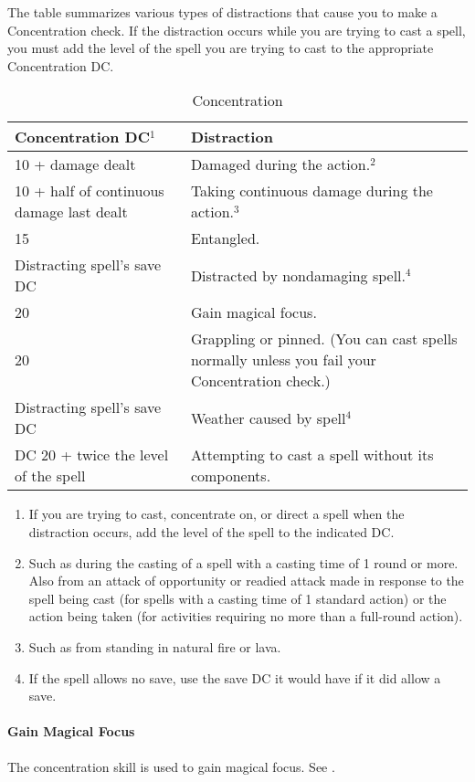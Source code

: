 The  table summarizes various types of distractions that cause you to make a Concentration check. 
If the distraction occurs while you are trying to cast a spell, 
you must add the level of the spell you are trying to cast to the appropriate Concentration DC. 
\begin{table*}
\centering
\caption{Concentration}
\label{tab:Concentration}
\begin{tabular}{p{}p{}}
\hline
\textbf{Concentration DC$^1$}&\textbf{Distraction}\\
\hline
10 + damage dealt&Damaged during the action.$^2$\\
10 + half of continuous damage last dealt&Taking continuous damage during the action.$^3$\\
15&Entangled.\\
Distracting spell's save DC&Distracted by nondamaging spell.$^4$\\
20&Gain magical focus.\\
20&Grappling or pinned. (You can cast spells normally unless you fail your Concentration check.)\\
Distracting spell's save DC&Weather caused by spell$^4$\\
DC 20 + twice the level of the spell&Attempting to cast a spell without its components.\\
\hline
\end{tabular}
\begin{enumerate}
\item If you are trying to cast, concentrate on, or direct a spell when the distraction occurs, add the level of the spell to the indicated DC.
\item Such as during the casting of a spell with a casting time of 1 round or more. 
Also from an attack of opportunity or readied attack made in response to the spell being cast 
(for spells with a casting time of 1 standard action) or the action being taken (for activities requiring no more than a full-round action).
\item Such as from standing in natural fire or lava.
\item If the spell allows no save, use the save DC it would have if it did allow a save.
\end{enumerate}
\end{table*}

\paragraph{Gain Magical Focus}
The concentration skill is used to gain magical focus. See .
